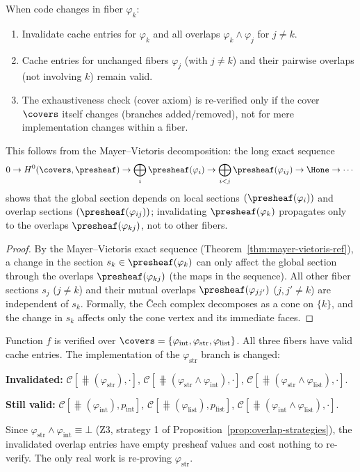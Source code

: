 \begin{proposition}
\label{prop:cache-invalidation}
When code changes in fiber $\varphi_k$:
\begin{enumerate}
\item Invalidate cache entries for $\varphi_k$ and all overlaps
  $\varphi_k \wedge \varphi_j$ for $j \ne k$.
\item Cache entries for unchanged fibers $\varphi_j$ (with $j \ne k$) and
  their pairwise overlaps (not involving $k$) remain valid.
\item The exhaustiveness check (cover axiom) is re-verified only if
  the cover $\covers$ itself changes (branches added/removed), not
  for mere implementation changes within a fiber.
\end{enumerate}
This follows from the Mayer--Vietoris decomposition: the long exact
sequence
\[
  0 \to H^0(\covers, \presheaf) \to \bigoplus_i \presheaf(\varphi_i)
  \to \bigoplus_{i<j} \presheaf(\varphi_{ij}) \to \Hone \to \cdots
\]
shows that the global section depends on local sections $(\presheaf(\varphi_i))$
and overlap sections $(\presheaf(\varphi_{ij}))$; invalidating $\presheaf(\varphi_k)$
propagates only to the overlaps $\presheaf(\varphi_{kj})$, not to other
fibers.
\end{proposition}

\begin{proof}
By the Mayer--Vietoris exact sequence (Theorem~\ref{thm:mayer-vietoris-ref}),
a change in the section $s_k \in \presheaf(\varphi_k)$ can only affect the
global section through the overlaps $\presheaf(\varphi_{kj})$ (the maps in
the sequence).  All other fiber sections $s_j$ ($j \ne k$) and their
mutual overlaps $\presheaf(\varphi_{jj'})$ ($j, j' \ne k$) are independent
of $s_k$.  Formally, the \v{C}ech complex decomposes as a cone on
$\{k\}$, and the change in $s_k$ affects only the cone vertex and its
immediate faces.
\end{proof}

\begin{example}
\label{ex:incremental-cache}
Function $f$ is verified over $\covers =
\{\varphi_{\mathrm{int}}, \varphi_{\mathrm{str}}, \varphi_{\mathrm{list}}\}$.
All three fibers have valid cache entries.  The implementation of the
$\varphi_{\mathrm{str}}$ branch is changed:

\textbf{Invalidated:}
$\mathcal{C}[\hash(\varphi_{\mathrm{str}}), \cdot]$,
$\mathcal{C}[\hash(\varphi_{\mathrm{str}} \wedge \varphi_{\mathrm{int}}), \cdot]$,
$\mathcal{C}[\hash(\varphi_{\mathrm{str}} \wedge \varphi_{\mathrm{list}}), \cdot]$.

\textbf{Still valid:}
$\mathcal{C}[\hash(\varphi_{\mathrm{int}}), p_{\mathrm{int}}]$,
$\mathcal{C}[\hash(\varphi_{\mathrm{list}}), p_{\mathrm{list}}]$,
$\mathcal{C}[\hash(\varphi_{\mathrm{int}} \wedge \varphi_{\mathrm{list}}), \cdot]$.

Since $\varphi_{\mathrm{str}} \wedge \varphi_{\mathrm{int}} \equiv \bot$
(Z3, strategy 1 of Proposition~\ref{prop:overlap-strategies}), the
invalidated overlap entries have empty presheaf values and cost nothing
to re-verify.  The only real work is re-proving $\varphi_{\mathrm{str}}$.
\end{example}

